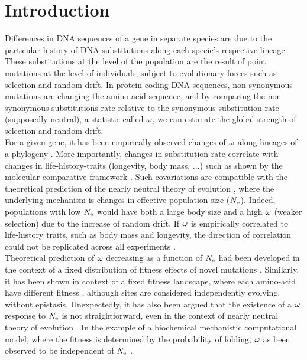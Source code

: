 \documentclass{article}
\begin{document}
\section*{Introduction}
Differences in DNA sequences of a gene in separate species are due to the particular history of DNA substitutions along each specie's respective lineage.
These substitutions at the level of the population are the result of point mutations at the level of individuals, subject to evolutionary forces such as selection and random drift.
In protein-coding DNA sequences, non-synonymous mutations are changing the amino-acid sequence, and by comparing the non-synonymous substitutions rate relative to the synonymous substitution rate (supposedly neutral), a statistic called $\omega$, we can estimate the global strength of selection and random drift.\\
For a given gene, it has been empirically observed changes of $\omega$ along lineages of a phylogeny \cite{Yang2001, Zhang2004}.
More importantly, changes in substitution rate correlate with changes in life-history-traits (longevity, body mass, ...) such as shown by the molecular comparative framework \cite{Lartillot2011,Weber2014}.
Such covariations are compatible with the theoretical prediction of the nearly neutral theory of evolution \cite{Ohta1972, Ohta1992}, where the underlying mechanism is changes in effective population size ($N_{\mathrm{e}}$).
Indeed, populations with low $N_{\mathrm{e}}$ would have both a large body size and a high $\omega$ (weaker selection) due to the increase of random drift.
If $\omega$ is empirically correlated to life-history traits, such as body mass and longevity, the direction of correlation could not be replicated across all experiments \cite{Figuet2016}.\\
Theoretical prediction of $\omega$ decreasing as a function of $N_{\mathrm{e}}$ had been developed in the context of a fixed distribution of fitness effects of novel mutations \cite{Ohta1972, Welch2008}. Similarly, it has been shown in context of a fixed fitness landscape, where each amino-acid have different fitness \cite{Spielman2015a, DosReis2015}, although sites are considered independently evolving, without epistasis.
Unexpectedly, it has also been argued that the existence of a $\omega$ response to $N_{\mathrm{e}}$ is not straightforward, even in the context of nearly neutral theory of evolution \cite{Lanfear2014}.
In the example of a biochemical mechanistic computational model, where the fitness is determined by the probability of folding, $\omega$ as been observed to be independent of $N_{\mathrm{e}}$ \cite{Goldstein2013}.
\end{document}
